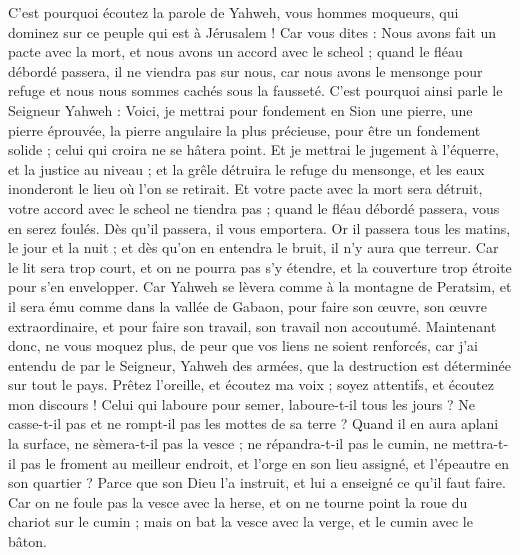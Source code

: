 \begin{multicols}{2}
C'est pourquoi écoutez la parole de Yahweh, vous hommes moqueurs, qui dominez sur ce peuple qui est à Jérusalem !
Car vous dites : Nous avons fait un pacte avec la mort, et nous avons un accord avec le scheol ; quand le fléau débordé passera, il ne viendra pas sur nous, car nous avons le mensonge pour refuge et nous nous sommes cachés sous la fausseté.
C'est pourquoi ainsi parle le Seigneur Yahweh : Voici, je mettrai pour fondement en Sion une pierre, une pierre éprouvée, la pierre angulaire la plus précieuse, pour être un fondement solide ; celui qui croira ne se hâtera point.
Et je mettrai le jugement à l'équerre, et la justice au niveau ; et la grêle détruira le refuge du mensonge, et les eaux inonderont le lieu où l'on se retirait.
Et votre pacte avec la mort sera détruit, votre accord avec le scheol ne tiendra pas ; quand le fléau débordé passera, vous en serez foulés.
Dès qu'il passera, il vous emportera. Or il passera tous les matins, le jour et la nuit ; et dès qu'on en entendra le bruit, il n'y aura que terreur.
Car le lit sera trop court, et on ne pourra pas s'y étendre, et la couverture trop étroite pour s'en envelopper.
Car Yahweh se lèvera comme à la montagne de Peratsim, et il sera ému comme dans la vallée de Gabaon, pour faire son œuvre, son œuvre extraordinaire, et pour faire son travail, son travail non accoutumé.
Maintenant donc, ne vous moquez plus, de peur que vos liens ne soient renforcés, car j'ai entendu de par le Seigneur, Yahweh des armées, que la destruction est déterminée sur tout le pays. 
Prêtez l'oreille, et écoutez ma voix ; soyez attentifs, et écoutez mon discours !
Celui qui laboure pour semer, laboure-t-il tous les jours ? Ne casse-t-il pas et ne rompt-il pas les mottes de sa terre ? 
Quand il en aura aplani la surface, ne sèmera-t-il pas la vesce ; ne répandra-t-il pas le cumin, ne mettra-t-il pas le froment au meilleur endroit, et l'orge en son lieu assigné, et l'épeautre en son quartier ?
Parce que son Dieu l'a instruit, et lui a enseigné ce qu'il faut faire.
Car on ne foule pas la vesce avec la herse, et on ne tourne point la roue du chariot sur le cumin ; mais on bat la vesce avec la verge, et le cumin avec le bâton.

\end{multicols}
